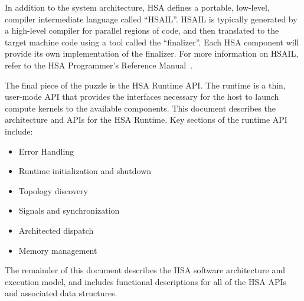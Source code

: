 \documentclass[final]{book}
\begin{document}
In addition to the system architecture, HSA defines a portable, low-level,
compiler intermediate language called ``HSAIL''.  HSAIL is typically generated
by a high-level compiler for parallel regions of code, and then translated to
the target machine code using a tool called the ``finalizer''.  Each HSA
component will provide its own implementation of the finalizer.  For more
information on HSAIL, refer to the HSA Programmer's Reference Manual~\cite{prm}.

The final piece of the puzzle is the HSA Runtime API.  The runtime is a thin,
user-mode API that provides the interfaces necessary for the host to launch
compute kernels to the available components. This document describes the
architecture and APIs for the HSA Runtime. Key sections of the runtime API
include:
\begin{itemize}
\item Error Handling
\item Runtime initialization and shutdown
\item Topology discovery
\item Signals and synchronization
\item Architected dispatch
\item Memory management
\end{itemize}

The remainder of this document describes the HSA software architecture and
execution model, and includes functional descriptions for all of the HSA APIs
and associated data structures.
\end{document}
